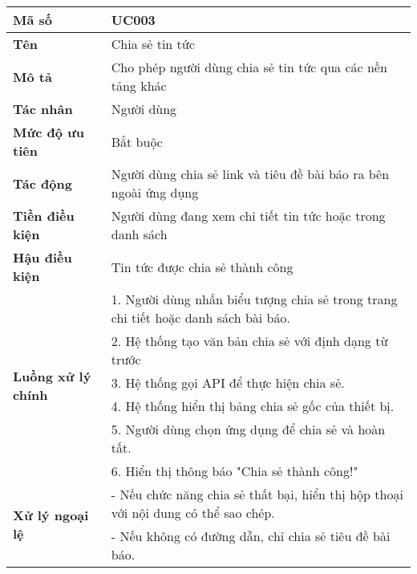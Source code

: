 \begingroup
\renewcommand{\arraystretch}{1.1}
\small
\centering
\noindent
\begin{minipage}{\textwidth}
    \centering
    \begin{tabular}{|m{3cm}|m{9cm}|}
        \hline
        \textbf{Mã số}  & UC003 \\
        \hline
        \textbf{Tên}  & Chia sẻ tin tức \\
        \hline
        \textbf{Mô tả}  & Cho phép người dùng chia sẻ tin tức qua các nền tảng khác\\
        \hline
        \textbf{Tác nhân}  & Người dùng \\
        \hline
        \textbf{Mức độ ưu tiên}  & Bắt buộc \\
        \hline
        \textbf{Tác động}  & Người dùng chia sẻ link và tiêu đề bài báo ra bên ngoài ứng dụng \\
        \hline
        \textbf{Tiền điều kiện}  & Người dùng đang xem chi tiết tin tức hoặc trong danh sách \\
        \hline
        \textbf{Hậu điều kiện}  & Tin tức được chia sẻ thành công \\
        \hline
        \multirow{6}{*}{\textbf{Luồng xử lý chính}}
            & 1. Người dùng nhấn biểu tượng chia sẻ trong trang chi tiết hoặc danh sách bài báo. \\
            & 2. Hệ thống tạo văn bản chia sẻ với định dạng từ trước \\
            & 3. Hệ thống gọi API để thực hiện chia sẻ. \\
            & 4. Hệ thống hiển thị bảng chia sẻ gốc của thiết bị. \\
            & 5. Người dùng chọn ứng dụng để chia sẻ và hoàn tất. \\
            & 6. Hiển thị thông báo "Chia sẻ thành công!" \\
        \hline
        \multirow{2}{*}{\textbf{Xử lý ngoại lệ}}
            & - Nếu chức năng chia sẻ thất bại, hiển thị hộp thoại với nội dung có thể sao chép. \\
            & - Nếu không có đường dẫn, chỉ chia sẻ tiêu đề bài báo. \\
        \hline
    \end{tabular}
\end{minipage}
\endgroup

